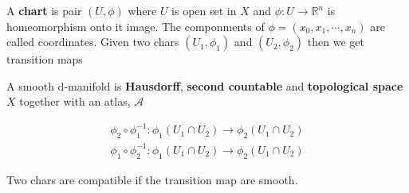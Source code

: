 \documentclass{article}
\begin{document}
\begin{defn}
    A \textbf{chart} is pair $(U, \phi)$ where $U$ is open set  in $X$ and $\phi: U \rightarrow \mathbb{R}^n$ is homeomorphism onto it image.
    The componments of $\phi = (x_0, x_1, \cdots , x_n)$ are called coordinates.
    Given two chars $(U_1, \phi_1)$ and $(U_2, \phi_2)$ then we get transition maps  
\end{defn}

\begin{defn}
A smooth d-manifold is \textbf{Hausdorff}, \textbf{second countable} and \textbf{topological space} $X$ together with an atlas, $\mathcal{A}$
\end{defn}

\begin{equation}
\begin{aligned} 
   \phi_2 \circ \phi_1^{-1}:\phi_1(U_1 \cap U_2) \rightarrow \phi_2(U_1 \cap U_2) \\  
   \phi_1 \circ \phi_2^{-1}:\phi_1(U_1 \cap U_2) \rightarrow \phi_2(U_1 \cap U_2) 
\end{aligned} 
\end{equation}

\begin{defn}
Two chars are compatible if the transition map are smooth.
\end{defn}
\end{document}
